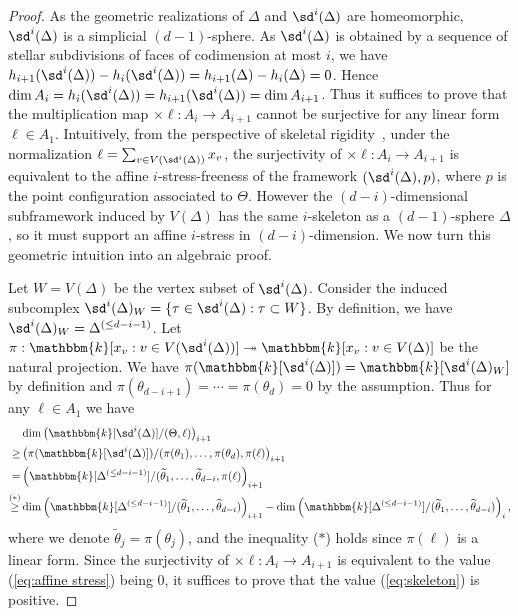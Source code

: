 \begin{proof}
As the geometric realizations of $\Delta$ and $\sd^i(\Delta)$ are homeomorphic, $\sd^i(\Delta)$ is a simplicial $(d-1)$-sphere.
As $\sd^i(\Delta)$ is obtained by a sequence of stellar subdivisions of faces of codimension at most $i$, we have $h_{i+1}(\sd^i(\Delta))-h_{i}(\sd^i(\Delta))=h_{i+1}(\Delta)-h_{i}(\Delta)=0$.
Hence $\dim A_i=h_{i}(\sd^i(\Delta))=h_{i+1}(\sd^i(\Delta))=\dim A_{i+1}$. 
Thus it suffices to prove that the multiplication map $\times \ell:A_i \rightarrow A_{i+1}$ cannot be surjective for any linear form $\ell \in A_1$.
Intuitively, from the perspective of skeletal rigidity~\cite{TW},
under the normalization $\ell=\sum_{v \in V(\sd^i(\Delta))} x_v$, the surjectivity of $\times \ell:A_i \rightarrow A_{i+1}$ is equivalent to the affine $i$-stress-freeness of the framework $(\sd^{i}(\Delta),p)$, where $p$ is the point configuration associated to $\Theta$. 
However the $(d-i)$-dimensional subframework induced by $V(\Delta)$ has the same $i$-skeleton as a $(d-1)$-sphere $\Delta$, so it must support an affine $i$-stress in $(d-i)$-dimension.
We now turn this geometric intuition into an algebraic proof.

Let $W=V(\Delta)$ be the vertex subset of $\sd^i(\Delta)$.
Consider the induced subcomplex $\sd^i(\Delta)_W=\{\tau \in \sd^i(\Delta):\tau \subset W\}$.
By definition, we have $\sd^i(\Delta)_W = \Delta^{(\leq d-i-1)}$.
Let $\pi:\mathbbm{k}[x_v : v \in V(\sd^i(\Delta))] \twoheadrightarrow \mathbbm{k}[x_v : v \in V(\Delta)]$ be the natural projection.
We have $\pi(\mathbbm{k}[\sd^i(\Delta)])=\mathbbm{k}[\sd^i(\Delta)_W]$ by definition and $\pi(\theta_{d-i+1})= \cdots= \pi(\theta_d)=0$ by the assumption. 
Thus for any $\ell \in A_1$ we have
\begin{align} 
&\dim \left(\mathbbm{k}[\sd^i(\Delta)]/(\Theta,\ell)\right)_{i+1} \label{eq:affine stress} \\
\geq& \left(\pi(\mathbbm{k}[\sd^i(\Delta)])/(\pi(\theta_1),\ldots,\pi(\theta_d),\pi(\ell)\right)_{i+1} \notag \\
 =& \left(\mathbbm{k}[\Delta^{(\leq d- i-1)}]/(\widetilde{\theta}_1,\ldots,\widetilde{\theta}_{d-i},\pi(\ell)\right)_{i+1} \notag \\
\overset{(*)}{\geq}& \dim \left(\mathbbm{k}[\Delta^{(\leq d-i-1)}]/(\widetilde{\theta}_1,\ldots,\widetilde{\theta}_{d-i})\right)_{i+1}- \dim \left(\mathbbm{k}[\Delta^{(\leq d- i-1)}]/(\widetilde{\theta}_1,\ldots,\widetilde{\theta}_{d-i})\right)_{i}, \label{eq:skeleton}
\end{align}
where we denote $\widetilde{\theta}_j=\pi(\theta_j)$, and the inequality ($*$) holds since $\pi(\ell)$ is a linear form.
Since the surjectivity of $\times\ell:A_i \rightarrow A_{i+1}$ is equivalent to the value (\ref{eq:affine stress}) being $0$, it suffices to prove that the value (\ref{eq:skeleton}) is positive.


\end{proof}
